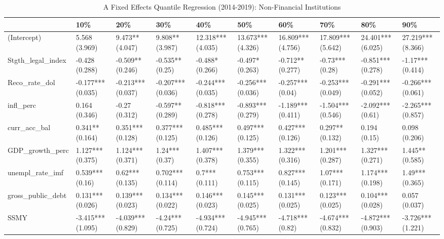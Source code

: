 \begin{table}[ht]
\centering
\caption{A Fixed Effects Quantile Regression (2014-2019): Non-Financial Institutions} 
\begingroup\small
\begin{tabular}{llllllllll}
  \toprule
 & 10\% & 20\% & 30\% & 40\% & 50\% & 60\% & 70\% & 80\% & 90\% \\ 
  \midrule
(Intercept) & 5.568 (3.969) & 9.473** (4.047) & 9.808** (3.987) & 12.318*** (4.035) & 13.673*** (4.326) & 16.809*** (4.756) & 17.809*** (5.642) & 24.401*** (6.025) & 27.219*** (8.366) \\ 
  Stgth\_legal\_index & -0.428 (0.288) & -0.509** (0.246) & -0.535** (0.25) & -0.488* (0.266) & -0.497* (0.263) & -0.712** (0.277) & -0.73*** (0.28) & -0.851*** (0.278) & -1.17*** (0.414) \\ 
  Reco\_rate\_dol & -0.177*** (0.035) & -0.213*** (0.037) & -0.207*** (0.036) & -0.244*** (0.035) & -0.256*** (0.036) & -0.257*** (0.04) & -0.253*** (0.049) & -0.291*** (0.052) & -0.266*** (0.061) \\ 
  infl\_perc & 0.164 (0.346) & -0.27 (0.312) & -0.597** (0.289) & -0.818*** (0.278) & -0.893*** (0.279) & -1.189*** (0.411) & -1.504*** (0.546) & -2.092*** (0.61) & -2.265*** (0.857) \\ 
  curr\_acc\_bal & 0.341** (0.164) & 0.351*** (0.128) & 0.377*** (0.125) & 0.485*** (0.126) & 0.497*** (0.125) & 0.427*** (0.126) & 0.297** (0.132) & 0.194 (0.15) & 0.098 (0.206) \\ 
  GDP\_growth\_perc & 1.127*** (0.375) & 1.124*** (0.371) & 1.24*** (0.37) & 1.407*** (0.378) & 1.379*** (0.355) & 1.322*** (0.316) & 1.201*** (0.287) & 1.327*** (0.271) & 1.445** (0.585) \\ 
  unempl\_rate\_imf & 0.539*** (0.16) & 0.62*** (0.135) & 0.702*** (0.114) & 0.7*** (0.111) & 0.753*** (0.115) & 0.827*** (0.145) & 1.07*** (0.171) & 1.174*** (0.198) & 1.49*** (0.365) \\ 
  gross\_public\_debt & 0.131*** (0.026) & 0.139*** (0.023) & 0.134*** (0.022) & 0.146*** (0.023) & 0.145*** (0.025) & 0.131*** (0.025) & 0.123*** (0.025) & 0.104*** (0.028) & 0.057 (0.037) \\ 
  SSMY & -3.415*** (1.095) & -4.039*** (0.829) & -4.24*** (0.725) & -4.934*** (0.724) & -4.945*** (0.765) & -4.718*** (0.82) & -4.674*** (0.832) & -4.872*** (0.903) & -3.726*** (1.221) \\ 
   \bottomrule
\end{tabular}
\endgroup
\end{table}
